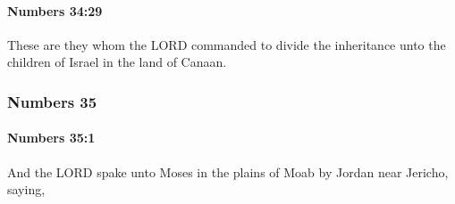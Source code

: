 		\paragraph{Numbers 34:29} %
			\label{NUMBERS-34-29}

			These are they whom the LORD commanded to divide the inheritance unto the children of Israel in the land of Canaan.

	\subsubsection{Numbers 35} %
		\label{NUMBERS-35}

		\paragraph{Numbers 35:1} %
			\label{NUMBERS-35-1}

			And the LORD spake unto Moses in the plains of Moab by Jordan near Jericho, saying,

